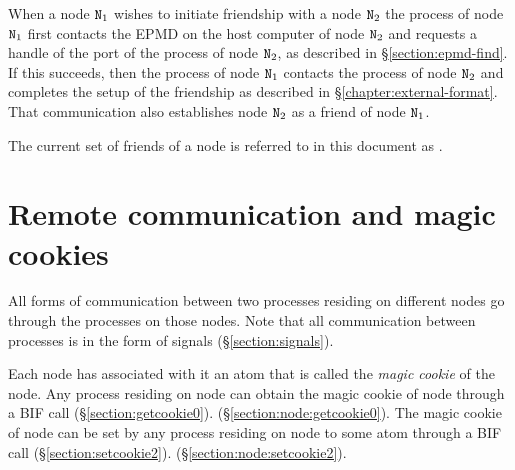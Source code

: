 When a node ${\tt{\sl N}}_1$ wishes to initiate friendship with a node ${\tt{\sl N}}_2$ the
 process of node ${\tt{\sl N}}_1$
first contacts the EPMD on the host computer of node ${\tt{\sl N}}_2$ and requests a
handle of the port of the  process of node ${\tt{\sl N}}_2$, as described
in \S\ref{section:epmd-find}.  If this succeeds, then the 
process of node ${\tt{\sl N}}_1$
contacts the  process of node ${\tt{\sl N}}_2$ and completes the setup of
the friendship as described in \S\ref{chapter:external-format}.  That communication
also establishes node ${\tt{\sl N}}_2$ as a friend of node ${\tt{\sl N}}_1$.

The current set of friends of a node  is referred to in this document as
.

\section{Remote communication and magic cookies}

\label{section:magic-cookie}

All forms of communication between two
processes residing on different nodes go through the
processes on those nodes.  Note that all communication between processes
is in the form of signals (\S\ref{section:signals}).

Each node  has associated with it an atom
that is called the \emph{magic cookie} of the node.  Any process residing on node 
can obtain the magic cookie of node  through a BIF call
\ifOld {}
(\S\ref{section:getcookie0}).\fi
\ifStd {}
(\S\ref{section:node:getcookie0}).\fi
The magic cookie of node  can be set
by any process residing on node 
to some atom  through a BIF call
\ifOld {}
(\S\ref{section:setcookie2}).\fi
\ifStd {}
(\S\ref{section:node:setcookie2}).\fi

